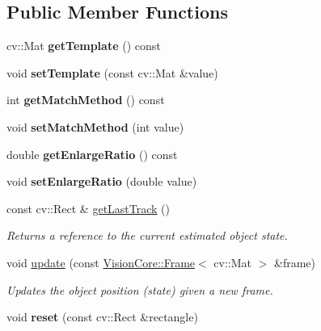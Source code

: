 \subsection*{Public Member Functions}
\begin{DoxyCompactItemize}
\item 
\hypertarget{class_viscv_1_1_templ_matching_tracker_ad885725f17a30d91f02f762a83e0df22}{}cv\+::\+Mat {\bfseries get\+Template} () const \label{class_viscv_1_1_templ_matching_tracker_ad885725f17a30d91f02f762a83e0df22}

\item 
\hypertarget{class_viscv_1_1_templ_matching_tracker_a60a256669585256ac591f9b7c1e0bbf2}{}void {\bfseries set\+Template} (const cv\+::\+Mat \&value)\label{class_viscv_1_1_templ_matching_tracker_a60a256669585256ac591f9b7c1e0bbf2}

\item 
\hypertarget{class_viscv_1_1_templ_matching_tracker_a634e061907a567a2412dd2be2f2bd24c}{}int {\bfseries get\+Match\+Method} () const \label{class_viscv_1_1_templ_matching_tracker_a634e061907a567a2412dd2be2f2bd24c}

\item 
\hypertarget{class_viscv_1_1_templ_matching_tracker_aec8c39e71fdcbc008cf3ee4a98546993}{}void {\bfseries set\+Match\+Method} (int value)\label{class_viscv_1_1_templ_matching_tracker_aec8c39e71fdcbc008cf3ee4a98546993}

\item 
\hypertarget{class_viscv_1_1_templ_matching_tracker_aaaf8ed01798b173afdd47496e2748810}{}double {\bfseries get\+Enlarge\+Ratio} () const \label{class_viscv_1_1_templ_matching_tracker_aaaf8ed01798b173afdd47496e2748810}

\item 
\hypertarget{class_viscv_1_1_templ_matching_tracker_a317d7ee9a29062a7357d9d15e7921ba3}{}void {\bfseries set\+Enlarge\+Ratio} (double value)\label{class_viscv_1_1_templ_matching_tracker_a317d7ee9a29062a7357d9d15e7921ba3}

\item 
const cv\+::\+Rect \& \hyperlink{class_viscv_1_1_templ_matching_tracker_ac9faa0124320853a52cb635538b604e4}{get\+Last\+Track} ()
\begin{DoxyCompactList}\small\item\em Returns a reference to the current estimated object state. \end{DoxyCompactList}\item 
void \hyperlink{class_viscv_1_1_templ_matching_tracker_ab233da15b6c7aad7d83c67057a558bd4}{update} (const \hyperlink{struct_vision_core_1_1_data_structures_1_1_frame}{Vision\+Core\+::\+Frame}$<$ cv\+::\+Mat $>$ \&frame)
\begin{DoxyCompactList}\small\item\em Updates the object position (state) given a new frame. \end{DoxyCompactList}\item 
\hypertarget{class_viscv_1_1_templ_matching_tracker_a2eab82c376502055b29c460ff8b26cf9}{}void {\bfseries reset} (const cv\+::\+Rect \&rectangle)\label{class_viscv_1_1_templ_matching_tracker_a2eab82c376502055b29c460ff8b26cf9}

\end{DoxyCompactItemize}
